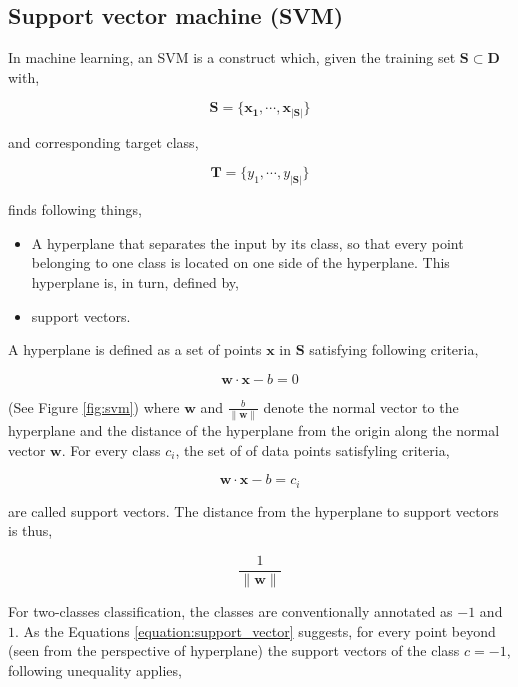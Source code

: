 \documentclass[pdftex,12pt,a4paper]{report}
\begin{document}
\subsection{Support vector machine (SVM)}
\label{subsection:svm}

In machine learning, an SVM is a construct which, given the training set $\mathbf{S} \subset \mathbf{D}$ with,

$$
\mathbf{S} = \{\mathbf{x_1}, \cdots, \mathbf{x}_{ \vert \mathbf{S} \vert }\}
$$

and corresponding target class,

$$
\mathbf{T} = \{y_1, \cdots, y_{\vert \mathbf{S} \vert}\}
$$

finds following things,

\begin{itemize}
\item A hyperplane that separates the input by its class, so that every point belonging to one class is located on one side of the hyperplane. This hyperplane is, in turn, defined by,
\item support vectors.
\end{itemize}

A hyperplane is defined as a set of points $\mathbf{x}$ in $\mathbf{S}$ satisfying following criteria,

\begin{equation}
\mathbf{w} \cdot \mathbf{x} - b = 0
\label{equation:hyperplane}
\end{equation}

(See Figure \ref{fig:svm}) where $\mathbf{w}$ and $\frac{b}{\| \mathbf{w} \|}$ denote the normal vector to the hyperplane and the distance of the hyperplane from the origin along the normal vector $\mathbf{w}$. For every class $c_i$, the set of of data points satisfyling criteria,

\begin{equation}
\mathbf{w} \cdot \mathbf{x} - b = c_i
\label{equation:support_vector}
\end{equation}

are called support vectors. The distance from the hyperplane to support vectors is thus,

$$\frac{1}{\| \mathbf{w} \|}$$

For two-classes classification, the classes are conventionally annotated as $-1$ and $1$. As the Equations \ref{equation:support_vector} suggests, for every point beyond (seen from the perspective of hyperplane) the support vectors of the class $c = -1$, following unequality applies,
\end{document}

